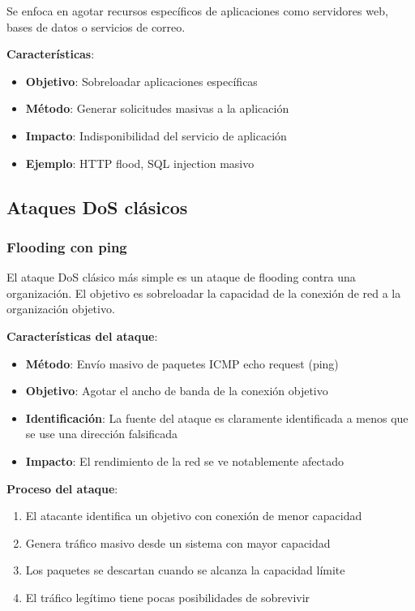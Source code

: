 Se enfoca en agotar recursos específicos de aplicaciones como servidores web, bases de datos o servicios de correo.

\textbf{Características}:
\begin{itemize}
    \item \textbf{Objetivo}: Sobreloadar aplicaciones específicas
    \item \textbf{Método}: Generar solicitudes masivas a la aplicación
    \item \textbf{Impacto}: Indisponibilidad del servicio de aplicación
    \item \textbf{Ejemplo}: HTTP flood, SQL injection masivo
\end{itemize}

\subsection{Ataques DoS clásicos}

\subsubsection{Flooding con ping}

El ataque DoS clásico más simple es un ataque de flooding contra una organización. El objetivo es sobreloadar la capacidad de la conexión de red a la organización objetivo.

\textbf{Características del ataque}:
\begin{itemize}
    \item \textbf{Método}: Envío masivo de paquetes ICMP echo request (ping)
    \item \textbf{Objetivo}: Agotar el ancho de banda de la conexión objetivo
    \item \textbf{Identificación}: La fuente del ataque es claramente identificada a menos que se use una dirección falsificada
    \item \textbf{Impacto}: El rendimiento de la red se ve notablemente afectado
\end{itemize}

\textbf{Proceso del ataque}:
\begin{enumerate}
    \item El atacante identifica un objetivo con conexión de menor capacidad
    \item Genera tráfico masivo desde un sistema con mayor capacidad
    \item Los paquetes se descartan cuando se alcanza la capacidad límite
    \item El tráfico legítimo tiene pocas posibilidades de sobrevivir
\end{enumerate}

